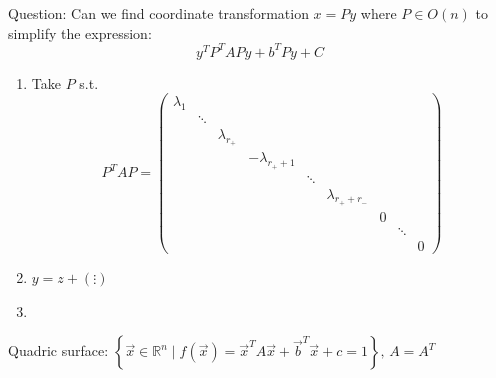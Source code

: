 Question: Can we find coordinate transformation $x=Py$ where $P\in O(n)$ to simplify the expression:
$$y^TP^TAPy+b^TPy+C$$

\begin{enumerate}
    \item Take $P$ s.t. $$P^TAP=\begin{pmatrix}
                  \lambda_1 &        &               &                  &        &                   &   &        &   \\
                            & \ddots &               &                  &        &                   &   &        &   \\
                            &        & \lambda_{r_+} &                  &        &                   &   &        &   \\
                            &        &               & -\lambda_{r_++1} &        &                   &   &        &   \\
                            &        &               &                  & \ddots &                   &   &        &   \\
                            &        &               &                  &        & \lambda_{r_++r_-} &   &        &   \\
                            &        &               &                  &        &                   & 0 &        &   \\
                            &        &               &                  &        &                   &   & \ddots &   \\
                            &        &               &                  &        &                   &   &        & 0
              \end{pmatrix}$$
    \item $y=z+\left(\vdots\right)$
    \item {}
\end{enumerate}

Quadric surface: $\left\{\overrightarrow{x}\in\mathbb{R}^n\mid f\left(\overrightarrow{x}\right)=\overrightarrow{x}^TA\overrightarrow{x}+\overrightarrow{b}^T\overrightarrow{x}+c=1\right\},\,A=A^T$